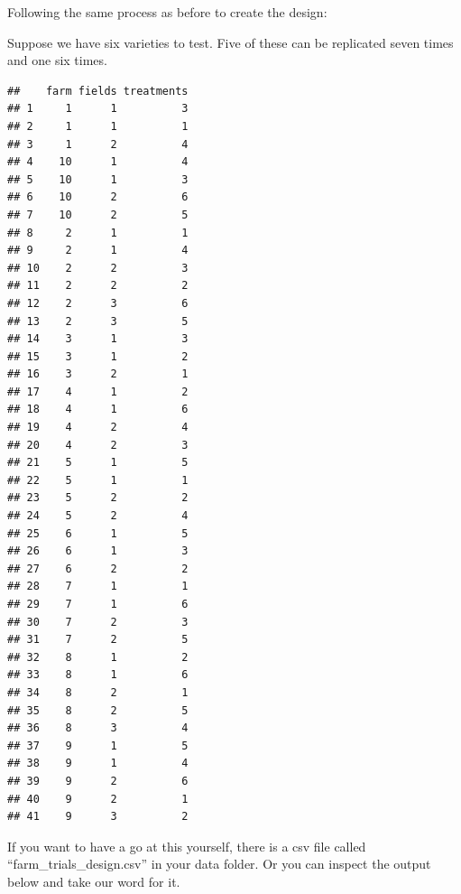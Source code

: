 \documentclass[
]{book}
\makeatletter
\newenvironment{Shaded}{\begin{snugshade}}{\end{snugshade}}
\newcommand{\AttributeTok}[1]{\textcolor[rgb]{0.77,0.63,0.00}{#1}}
\newcommand{\DecValTok}[1]{\textcolor[rgb]{0.00,0.00,0.81}{#1}}
\newcommand{\FunctionTok}[1]{\textcolor[rgb]{0.00,0.00,0.00}{#1}}
\newcommand{\NormalTok}[1]{#1}
\newcommand{\OtherTok}[1]{\textcolor[rgb]{0.56,0.35,0.01}{#1}}
\newcommand{\SpecialCharTok}[1]{\textcolor[rgb]{0.00,0.00,0.00}{#1}}
\newenvironment{kframe}{%
\medskip{}
\setlength{\fboxsep}{.8em}
 \def\at@end@of@kframe{}%
 \ifinner\ifhmode%
  \def\at@end@of@kframe{\end{minipage}}%
  \begin{minipage}{\columnwidth}%
 \fi\fi%
 \def\FrameCommand##1{\hskip\@totalleftmargin \hskip-\fboxsep
 \colorbox{shadecolor}{##1}\hskip-\fboxsep
     \hskip-\linewidth \hskip-\@totalleftmargin \hskip\columnwidth}%
 \MakeFramed {\advance\hsize-\width
   \@totalleftmargin\z@ \linewidth\hsize
   \@setminipage}}%
 {\par\unskip\endMakeFramed%
 \at@end@of@kframe}
\newenvironment{rmdblock}[1]
  {
  \begin{itemize}
  \renewcommand{\labelitemi}{
    \raisebox{-.7\height}[0pt][0pt]{
      {\setkeys{Gin}{width=3em,keepaspectratio}\texttt{[image: images/\#1]}}
    }
  }
  \setlength{\fboxsep}{1em}
  \begin{kframe}
  \item
  }
  {
  \end{kframe}
  \end{itemize}
  }
\newenvironment{rmdnote}
  {\begin{rmdblock}{note}}
  {\end{rmdblock}}
\makeatother
\begin{document}
Following the same process as before to create the design:

Suppose we have six varieties to test. Five of these can be replicated seven times and one six times.

\begin{Shaded}
\end{Shaded}

\begin{verbatim}
##    farm fields treatments
## 1     1      1          3
## 2     1      1          1
## 3     1      2          4
## 4    10      1          4
## 5    10      1          3
## 6    10      2          6
## 7    10      2          5
## 8     2      1          1
## 9     2      1          4
## 10    2      2          3
## 11    2      2          2
## 12    2      3          6
## 13    2      3          5
## 14    3      1          3
## 15    3      1          2
## 16    3      2          1
## 17    4      1          2
## 18    4      1          6
## 19    4      2          4
## 20    4      2          3
## 21    5      1          5
## 22    5      1          1
## 23    5      2          2
## 24    5      2          4
## 25    6      1          5
## 26    6      1          3
## 27    6      2          2
## 28    7      1          1
## 29    7      1          6
## 30    7      2          3
## 31    7      2          5
## 32    8      1          2
## 33    8      1          6
## 34    8      2          1
## 35    8      2          5
## 36    8      3          4
## 37    9      1          5
## 38    9      1          4
## 39    9      2          6
## 40    9      2          1
## 41    9      3          2
\end{verbatim}

\begin{rmdnote}
If you want to have a go at this yourself, there is a csv file called ``farm\_trials\_design.csv'' in your data folder. Or you can inspect the output below and take our word for it.
\end{rmdnote}
\end{document}
